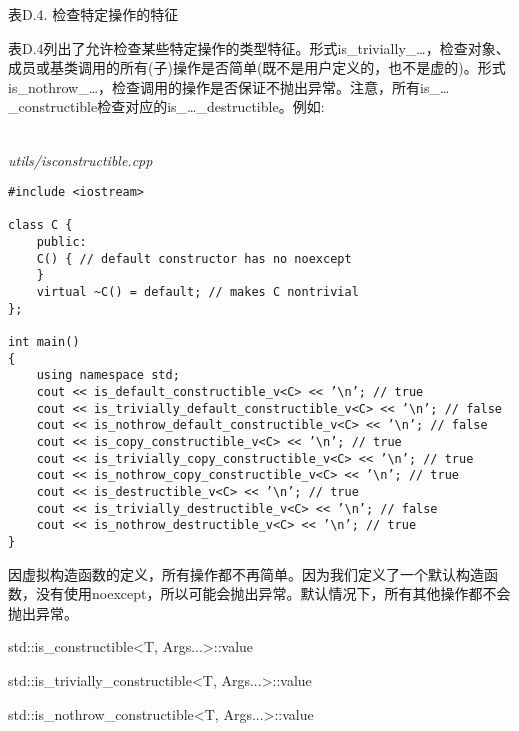 \begin{center}
表D.4. 检查特定操作的特征
\end{center}

表D.4列出了允许检查某些特定操作的类型特征。形式is\_trivially\_…，检查对象、成员或基类调用的所有(子)操作是否简单(既不是用户定义的，也不是虚的)。形式is\_nothrow\_…，检查调用的操作是否保证不抛出异常。注意，所有is\_…\_constructible检查对应的is\_…\_destructible。例如:

\hspace*{\fill} \\ %
\noindent
\textit{utils/isconstructible.cpp}
\begin{lstlisting}[style=styleCXX]
#include <iostream>

class C {
	public:
	C() { // default constructor has no noexcept
	}
	virtual ~C() = default; // makes C nontrivial
};

int main()
{
	using namespace std;
	cout << is_default_constructible_v<C> << ’\n’; // true
	cout << is_trivially_default_constructible_v<C> << ’\n’; // false
	cout << is_nothrow_default_constructible_v<C> << ’\n’; // false
	cout << is_copy_constructible_v<C> << ’\n’; // true
	cout << is_trivially_copy_constructible_v<C> << ’\n’; // true
	cout << is_nothrow_copy_constructible_v<C> << ’\n’; // true
	cout << is_destructible_v<C> << ’\n’; // true
	cout << is_trivially_destructible_v<C> << ’\n’; // false
	cout << is_nothrow_destructible_v<C> << ’\n’; // true
}
\end{lstlisting}

因虚拟构造函数的定义，所有操作都不再简单。因为我们定义了一个默认构造函数，没有使用noexcept，所以可能会抛出异常。默认情况下，所有其他操作都不会抛出异常。

std::is\_constructible<T, Args...>::value

std::is\_trivially\_constructible<T, Args...>::value

std::is\_nothrow\_constructible<T, Args...>::value

